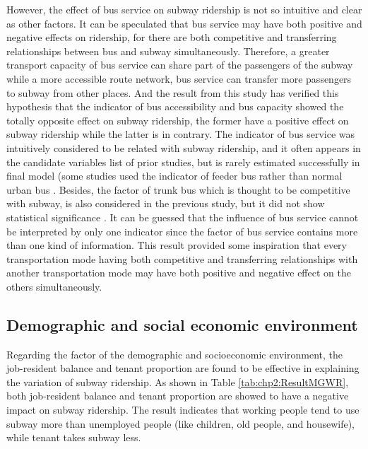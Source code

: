 %
However, the effect of bus service on subway ridership is not so intuitive and clear as other factors. It can be speculated that bus service may have both positive and negative effects on ridership, for there are both competitive and transferring relationships between bus and subway simultaneously. Therefore, a greater transport capacity of bus service can share part of the passengers of the subway while a more accessible route network, bus service can transfer more passengers to subway from other places. And the result from this study has verified this hypothesis that the indicator of bus accessibility and bus capacity showed the totally opposite effect on subway ridership, the former have a positive effect on subway ridership while the latter is in contrary. The indicator of bus service was intuitively considered to be related with subway ridership, and it often appears in the candidate variables list of prior studies, but is rarely estimated successfully in final model (some studies used the indicator of feeder bus rather than normal urban bus \cite{sohn2010factors,cardozo2012application,zhao2013influences}. Besides, the factor of trunk bus which is thought to be competitive with subway, is also considered in the previous study, but it did not show statistical significance \cite{sohn2010factors}. It can be guessed that the influence of bus service cannot be interpreted by only one indicator since the factor of bus service contains more than one kind of information. This result provided some inspiration that every transportation mode having both competitive and transferring relationships with another transportation mode may have both positive and negative effect on the others simultaneously.

%
\subsection{Demographic and social economic environment}
%
Regarding the factor of the demographic and socioeconomic environment, the job-resident balance and tenant proportion are found to be effective in explaining the variation of subway ridership. As shown in Table \ref{tab:chp2:ResultMGWR}, both job-resident balance and tenant proportion are showed to have a negative impact on subway ridership. The result indicates that working people tend to use subway more than unemployed people (like children, old people, and housewife), while tenant takes subway less.


